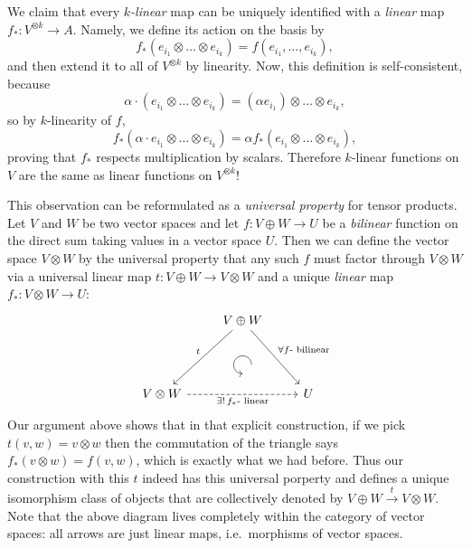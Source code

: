 \begin{example}
We claim that every \emph{$k$-linear} map can be uniquely identified
with a \emph{linear} map $f_{\ast}:V^{\otimes k}\to A$. Namely,
we define its action on the basis by
\begin{equation}
f_{\ast}\left(e_{i_{1}}\otimes\ldots\otimes e_{i_{k}}\right)=f\left(e_{i_{1}},\ldots,e_{i_{k}}\right),
\end{equation}
and then extend it to all of $V^{\otimes k}$ by linearity. Now, this
definition is self-consistent, because
\begin{equation}
\alpha\cdot\left(e_{i_{1}}\otimes\ldots\otimes e_{i_{k}}\right)=\left(\alpha e_{i_{1}}\right)\otimes\ldots\otimes e_{i_{k}},
\end{equation}
so by $k$-linearity of $f$, 
\[
f_{\ast}\left(\alpha\cdot e_{i_{1}}\otimes\ldots\otimes e_{i_{k}}\right)=\alpha f_{\ast}\left(e_{i_{1}}\otimes\ldots\otimes e_{i_{k}}\right),
\]
proving that $f_{\ast}$ respects multiplication by scalars. Therefore
$k$-linear functions on $V$ are the same as linear functions on
$V^{\otimes k}$! 

This observation can be reformulated as a \emph{universal property} for tensor products. Let $V$ and $W$ be two vector spaces and let $f:V\oplus W\to U$ be a \emph{bilinear} function on the direct sum taking values in a vector space $U$. Then we can define the vector space $V\otimes W$ by the universal property that any such $f$ must factor through $V\otimes W$ via a universal linear map $t:V\oplus W\to V\otimes W$ and a unique \emph{linear} map $f_\ast:V\otimes W\to U$:
\[\begin{tikzcd}[every matrix/.append style={name=m},   
execute at end picture={\draw [<-] ([xshift=0mm,yshift=-6mm]m-2-2.north) arc[start angle=-90,delta angle=-270,radius=0.25cm];}]
   & V\oplus W\arrow[ddl,swap,"t" ]\arrow[ddr,"\forall f\text{- bilinear}"] & \\
   & \, & \\
   V\otimes W \arrow[rr,dashed,swap,"\exists!\,f_\ast\text{- linear}"]& & U
\end{tikzcd}\]
Our argument above shows that in that explicit construction, if we pick $t(v,w)=v\otimes w$ then the commutation of the triangle says $f_\ast (v\otimes w)=f(v,w)$, which is exactly what we had before. Thus our construction with this $t$ indeed has this universal porperty and defines a unique isomorphism class of objects that are collectively denoted by  $V\oplus W\overset{t}{\to}V\otimes W $. Note that the above diagram lives completely within the category of vector spaces: all arrows are just linear maps, i.e.\ morphisms of vector spaces.


\end{example}
